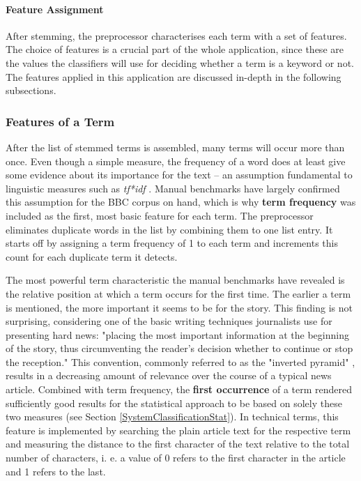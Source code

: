 \documentclass[11pt,a4paper,twoside]{article}
\begin{document}
\paragraph{Feature Assignment} After stemming, the preprocessor characterises each term with a set of features. The choice of features is a crucial part of the whole application, since these are the values the classifiers will use for deciding whether a term is a keyword or not. The features applied in this application are discussed in-depth in the following subsections.

\subsubsection{Features of a Term} \label{SystemPreprocessFeatures}

After the list of stemmed terms is assembled, many terms will occur more than once. Even though a simple measure, the frequency of a word does at least give some evidence about its importance for the text -- an assumption fundamental to linguistic measures such as \emph{tf*idf} \cite{Salton1988Term-weightingRetrieval}. Manual benchmarks have largely confirmed this assumption for the BBC corpus on hand, which is why \textbf{term frequency} was included as the first, most basic feature for each term. The preprocessor eliminates duplicate words in the list by combining them to one list entry. It starts off by assigning a term frequency of 1 to each term and increments this count for each duplicate term it detects.

The most powerful term characteristic the manual benchmarks have revealed is the relative position at which a term occurs for the first time. The earlier a term is mentioned, the more important it seems to be for the story. This finding is not surprising, considering one of the basic writing techniques journalists use for presenting hard news: "placing the most important information at the beginning of the story, thus circumventing the reader's decision whether to continue or stop the reception." \cite[p. 501]{Pottker2003NewsAppear} This convention, commonly referred to as the "inverted pyramid" \cite[ibd.]{Pottker2003NewsAppear}, results in a decreasing amount of relevance over the course of a typical news article. Combined with term frequency, the \textbf{first occurrence} of a term rendered sufficiently good results for the statistical approach to be based on solely these two measures (see Section \ref{SystemClassificationStat}). In technical terms, this feature is implemented by searching the plain article text for the respective term and measuring the distance to the first character of the text relative to the total number of characters, i. e. a value of 0 refers to the first character in the article and 1 refers to the last.
\end{document}
